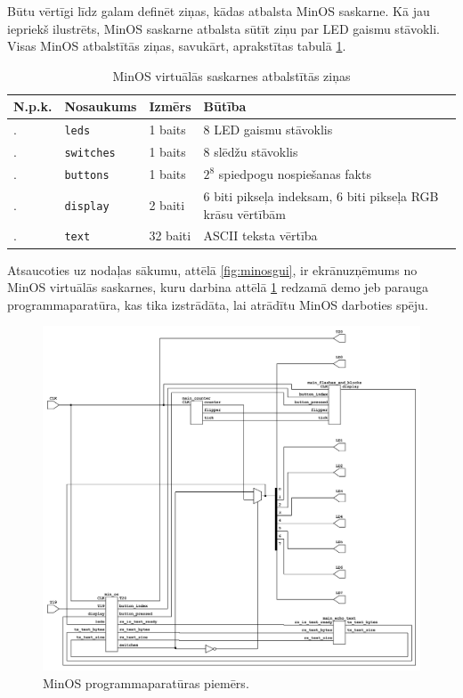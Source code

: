 Būtu vērtīgi līdz galam definēt ziņas, kādas atbalsta MinOS saskarne. Kā jau
iepriekš ilustrēts, MinOS saskarne atbalsta sūtīt ziņu par LED gaismu stāvokli.
Visas MinOS atbalstītās ziņas, savukārt, aprakstītas tabulā \ref{table:minospackets}.

\begin{table}[H]
    \newcommand\rownumber{\stepcounter{minospacketcounter}\arabic{minospacketcounter}.}
    \begin{tabular}{ |p{1cm}|p{3cm}|p{2cm}|p{8cm}| }
    \hline
    N.p.k.&Nosaukums&Izmērs&Būtība \\
    \hline
    \rownumber&\lstinline!leds!&1 baits&8 LED gaismu stāvoklis \\
    \hline
    \rownumber&\lstinline!switches!&1 baits&8 slēdžu stāvoklis \\
    \hline
    \rownumber&\lstinline!buttons!&1 baits&\(2^8\) spiedpogu nospiešanas fakts \\
    \hline
    \rownumber&\lstinline!display!&2 baiti&6 biti pikseļa indeksam, 6 biti pikseļa RGB krāsu vērtībām \\
    \hline
    \rownumber&\lstinline!text!&32 baiti&ASCII teksta vērtība \\
    \hline
    \end{tabular}
    \centering
    \captionsetup{justification=centering}
    \caption{MinOS virtuālās saskarnes atbalstītās ziņas}
    \label{table:minospackets}
\end{table}

Atsaucoties uz nodaļas sākumu, attēlā \ref{fig:minosgui}, ir ekrānuzņēmums no
MinOS virtuālās saskarnes, kuru darbina attēlā \ref{fig:minosusage} redzamā demo
jeb parauga programmaparatūra, kas tika izstrādāta, lai atrādītu MinOS darboties
spēju.

\begin{figure}[H]
    \includegraphics[width=1.0\linewidth]{assets/min-os-usage-grey.png}
    \centering
    \caption{MinOS programmaparatūras piemērs.}
    \label{fig:minosusage}
\end{figure}

